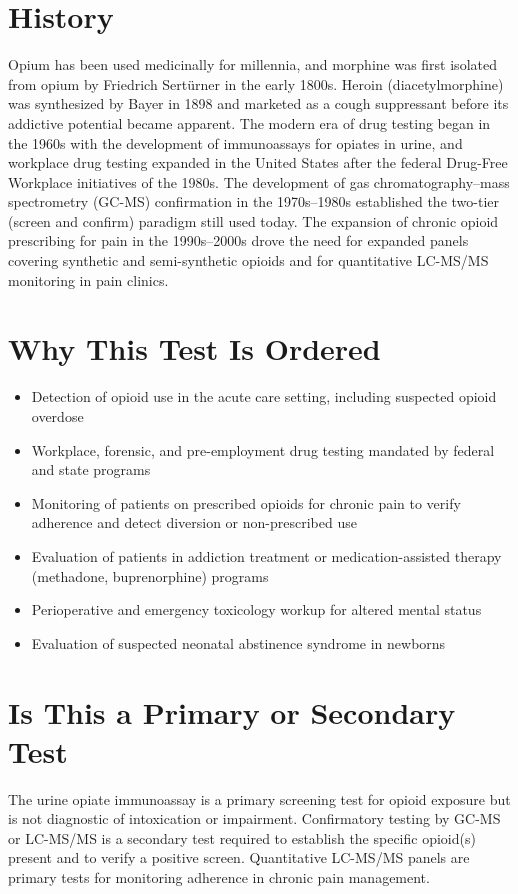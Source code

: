 \section*{History}
Opium has been used medicinally for millennia, and morphine was first isolated from opium by Friedrich Sertürner in the early 1800s. Heroin (diacetylmorphine) was synthesized by Bayer in 1898 and marketed as a cough suppressant before its addictive potential became apparent. The modern era of drug testing began in the 1960s with the development of immunoassays for opiates in urine, and workplace drug testing expanded in the United States after the federal Drug-Free Workplace initiatives of the 1980s. The development of gas chromatography--mass spectrometry (GC-MS) confirmation in the 1970s--1980s established the two-tier (screen and confirm) paradigm still used today. The expansion of chronic opioid prescribing for pain in the 1990s--2000s drove the need for expanded panels covering synthetic and semi-synthetic opioids and for quantitative LC-MS/MS monitoring in pain clinics.
\section*{Why This Test Is Ordered}
\begin{itemize}
  \item Detection of opioid use in the acute care setting, including suspected opioid overdose
  \item Workplace, forensic, and pre-employment drug testing mandated by federal and state programs
  \item Monitoring of patients on prescribed opioids for chronic pain to verify adherence and detect diversion or non-prescribed use
  \item Evaluation of patients in addiction treatment or medication-assisted therapy (methadone, buprenorphine) programs
  \item Perioperative and emergency toxicology workup for altered mental status
  \item Evaluation of suspected neonatal abstinence syndrome in newborns
\end{itemize}
\section*{Is This a Primary or Secondary Test}
The urine opiate immunoassay is a primary screening test for opioid exposure but is not diagnostic of intoxication or impairment. Confirmatory testing by GC-MS or LC-MS/MS is a secondary test required to establish the specific opioid(s) present and to verify a positive screen. Quantitative LC-MS/MS panels are primary tests for monitoring adherence in chronic pain management.
